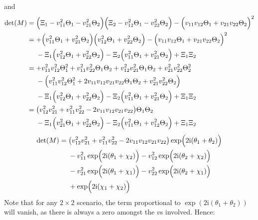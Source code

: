 \documentclass[
	english,
	a4paper,
	fontsize=10pt,
	parskip=half,
	titlepage=true,
	DIV=12,
	final
]{scrreprt}
\newcommand*{\iunit}{\ensuremath{\mathrm{i}}}
\begin{document}
and
\begin{align*}
	\det(M)
&=
	\qty(\Big.
		\Xi_1 - v_{11}^2 \Theta_1 - v_{21}^2 \Theta_2
	)
	\qty(\Big.
		\Xi_2 - v_{12}^2 \Theta_1 - v_{22}^2 \Theta_2
	)
	-
	\qty(\Big.
		v_{11} v_{12} \Theta_1 + v_{21} v_{22} \Theta_2
	)^2 \\
&=
	+ \qty(\Big.
		v_{11}^2 \Theta_1   +   v_{21}^2 \Theta_2
	)
	\qty(\Big.
		v_{12}^2 \Theta_1   +   v_{22}^2 \Theta_2
	)
	-
	\qty(\Big.
		v_{11} v_{12} \Theta_1 + v_{21} v_{22} \Theta_2
	)^2 \\
&\quad~ 
	- \Xi_1 \qty(\Big.
		v_{12}^2 \Theta_1   +   v_{22}^2 \Theta_2
	)
	- \Xi_2 \qty(\Big.
		v_{11}^2 \Theta_1   +   v_{21}^2 \Theta_2
	) + \Xi_1 \Xi_2 \\
&=
	+ v_{11}^2 v_{12}^2 \Theta_1^2
	+ v_{11}^2 v_{22}^2 \Theta_1 \Theta_2
	+ v_{12}^2 v_{21}^2 \Theta_1 \Theta_2
	+ v_{21}^2 v_{22}^2          \Theta_2^2
	\\
&\quad~
	- \qty( \Big.
		    v_{11}^2      v_{12}^2      \Theta_1^2
		+ 2 v_{11} v_{12} v_{21} v_{22} \Theta_1 \Theta_2
		+          v_{21}^2      v_{22}^2        \Theta_2
	) \\
&\quad~
	- \Xi_1 \qty(\Big.
		v_{12}^2 \Theta_1   +   v_{22}^2 \Theta_2
	)
	- \Xi_2 \qty(\Big.
		v_{11}^2 \Theta_1   +   v_{21}^2 \Theta_2
	) + \Xi_1 \Xi_2 \\
&=
	\qty(
		v_{12}^2 v_{21}^2 + v_{11}^2 v_{22}^2
		-
		2 v_{11} v_{12} v_{21} v_{22}
	) \Theta_1 \Theta_2 \\
&\quad~
	- \Xi_1 \qty(\Big.
		v_{21}^2 \Theta_1   +   v_{22}^2 \Theta_2
	)
	- \Xi_2 \qty(\Big.
		v_{11}^2 \Theta_1   +   v_{12}^2 \Theta_2
	) + \Xi_1 \Xi_2
\end{align*}
\begin{align}
\nonumber
	\det(M)
&=
	\qty(
		  v_{12}^2 v_{21}^2
		+ v_{11}^2 v_{22}^2
		- 2 v_{11} v_{12} v_{21} v_{22}
	) \exp(\Big. 2\iunit (\theta_1 + \theta_2)) \\
&\quad~
\nonumber
	- v_{11}^2 \exp(\Big. 2\iunit (\theta_1 + \chi_2))
	- v_{12}^2 \exp(\Big. 2\iunit (\theta_2 + \chi_2)) \\
&\quad~
\nonumber
	- v_{21}^2 \exp(\Big. 2\iunit (\theta_1 + \chi_1))
	- v_{22}^2 \exp(\Big. 2\iunit (\theta_2 + \chi_1)) \\
&\quad~
	+ \exp(\Big. 2\iunit (\chi_1 + \chi_2))
\end{align}
Note that for any $2 \times 2$ scenario, the term proportional to $\exp(2\iunit (\theta_1 + \theta_2))$ will vanish, as there is always a zero amongst the $v$s involved. Hence:
\end{document}
